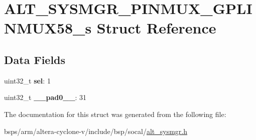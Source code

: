 \hypertarget{structALT__SYSMGR__PINMUX__GPLINMUX58__s}{}\section{A\+L\+T\+\_\+\+S\+Y\+S\+M\+G\+R\+\_\+\+P\+I\+N\+M\+U\+X\+\_\+\+G\+P\+L\+I\+N\+M\+U\+X58\+\_\+s Struct Reference}
\label{structALT__SYSMGR__PINMUX__GPLINMUX58__s}
\subsection*{Data Fields}
\begin{DoxyCompactItemize}
\item 
\mbox{\label{structALT__SYSMGR__PINMUX__GPLINMUX58__s_a0e4790d1dda5744eee2f7174be3f3cb8}} 
uint32\+\_\+t {\bfseries sel}\+: 1
\item 
\mbox{\label{structALT__SYSMGR__PINMUX__GPLINMUX58__s_aa4be698e624e12467707ded5d3394844}} 
uint32\+\_\+t {\bfseries \+\_\+\+\_\+pad0\+\_\+\+\_\+}\+: 31
\end{DoxyCompactItemize}


The documentation for this struct was generated from the following file\+:\begin{DoxyCompactItemize}
\item 
bsps/arm/altera-\/cyclone-\/v/include/bsp/socal/\mbox{\hyperlink{alt__sysmgr_8h}{alt\+\_\+sysmgr.\+h}}\end{DoxyCompactItemize}
